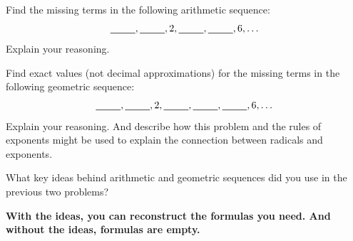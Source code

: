 \begin{question}
Find the missing terms in the following arithmetic sequence:  
$$\rule[-2pt]{25pt}{.5pt}, \rule[-2pt]{25pt}{.5pt},  2,  \rule[-2pt]{25pt}{.5pt}, \rule[-2pt]{25pt}{.5pt}, 6, \dots$$
Explain your reasoning.  
\end{question}

\begin{question}
Find exact values (not decimal approximations) for the missing terms in the following geometric sequence:  
$$\rule[-2pt]{25pt}{.5pt}, \rule[-2pt]{25pt}{.5pt},  2,  \rule[-2pt]{25pt}{.5pt},  \rule[-2pt]{25pt}{.5pt}, \rule[-2pt]{25pt}{.5pt}, 6, \dots$$
Explain your reasoning.  And describe how this problem and the rules of exponents might be used to explain the connection between radicals and exponents.  
\end{question}

\begin{question}
What key ideas behind arithmetic and geometric sequences did you use in the previous two problems? 
\end{question}

\begin{center}
\textbf{With the ideas, you can reconstruct the formulas you need.  And without the ideas, formulas are empty.}  
\end{center}


